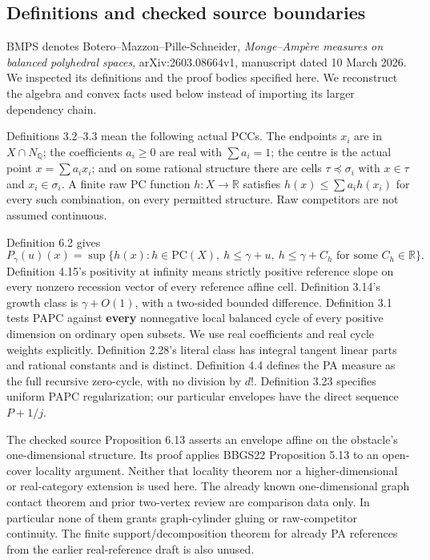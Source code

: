 \documentclass[
  11pt,
]{article}
\begin{document}
\subsection{Definitions and checked source
boundaries}\label{definitions-and-checked-source-boundaries}

BMPS denotes Botero--Mazzon--Pille-Schneider, \emph{Monge--Ampère
measures on balanced polyhedral spaces}, arXiv:2603.08664v1, manuscript
dated 10 March 2026. We inspected its definitions and the proof bodies
specified here. We reconstruct the algebra and convex facts used below
instead of importing its larger dependency chain.

Definitions 3.2--3.3 mean the following actual PCCs. The endpoints
\(x_i\) are in \(X\cap N_{\mathbb Q}\); the coefficients \(a_i\geq0\)
are real with \(\sum a_i=1\); the centre is the actual point
\(x=\sum a_ix_i\); and on some rational structure there are cells
\(\tau\preceq\sigma_i\) with \(x\in\tau\) and \(x_i\in\sigma_i\). A
finite raw PC function \(h:X\to\mathbb R\) satisfies
\(h(x)\leq\sum a_ih(x_i)\) for every such combination, on every
permitted structure. Raw competitors are not assumed continuous.

Definition 6.2 gives \[
P_\gamma(u)(x)=\sup\{h(x):h\in\mathrm{PC}(X),\ h\leq\gamma+u,
\ h\leq\gamma+C_h\text{ for some }C_h\in\mathbb R\}. \tag{3}
\] Definition 4.15's positivity at infinity means strictly positive
reference slope on every nonzero recession vector of every reference
affine cell. Definition 3.14's growth class is \(\gamma+O(1)\), with a
two-sided bounded difference. Definition 3.1 tests PAPC against
\textbf{every} nonnegative local balanced cycle of every positive
dimension on ordinary open subsets. We use real coefficients and real
cycle weights explicitly. Definition 2.28's literal class has integral
tangent linear parts and rational constants and is distinct. Definition
4.4 defines the PA measure as the full recursive zero-cycle, with no
division by \(d!\). Definition 3.23 specifies uniform PAPC
regularization; our particular envelopes have the direct sequence
\(P+1/j\).

The checked source Proposition 6.13 asserts an envelope affine on the
obstacle's one-dimensional structure. Its proof applies BBGS22
Proposition 5.13 to an open-cover locality argument. Neither that
locality theorem nor a higher-dimensional or real-category extension is
used here. The already known one-dimensional graph contact theorem and
prior two-vertex review are comparison data only. In particular none of
them grants graph-cylinder gluing or raw-competitor continuity. The
finite support/decomposition theorem for already PA references from the
earlier real-reference draft is also unused.
\end{document}
